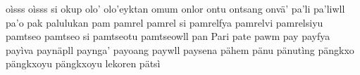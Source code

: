 oìsss\hspace{2mm}
oìsss si\hspace{2mm}
okup\hspace{2mm}
olo'\hspace{2mm}
olo'eyktan\hspace{2mm}
omum\hspace{2mm}
onlor\hspace{2mm}
ontu\hspace{2mm}
ontsang\hspace{2mm}
onvä'\hspace{2mm}
pa'li\hspace{2mm}
pa'liwll\hspace{2mm}
pa'o\hspace{2mm}
pak\hspace{2mm}
palulukan\hspace{2mm}
pam\hspace{2mm}
pamrel\hspace{2mm}
pamrel si\hspace{2mm}
pamrelfya\hspace{2mm}
pamrelvi\hspace{2mm}
pamrelsiyu\hspace{2mm}
pamtseo\hspace{2mm}
pamtseo si\hspace{2mm}
pamtseotu\hspace{2mm}
pamtseowll\hspace{2mm}
pan\hspace{2mm}
Pari\hspace{2mm}
pate\hspace{2mm}
pawm\hspace{2mm}
pay\hspace{2mm}
payfya\hspace{2mm}
payìva\hspace{2mm}
paynäpll\hspace{2mm}
paynga'\hspace{2mm}
payoang\hspace{2mm}
paywll\hspace{2mm}
paysena\hspace{2mm}
pähem\hspace{2mm}
pänu\hspace{2mm}
pänutìng\hspace{2mm}
pängkxo\hspace{2mm}
pängkxoyu\hspace{2mm}
pängkxoyu lekoren\hspace{2mm}
pätsì\hspace{2mm}
